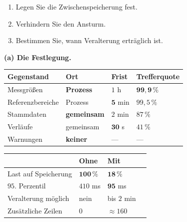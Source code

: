 \begin{aufgabe}
\begin{enumerate}[label=(\alph*)]
\item Legen Sie die Zwischenspeicherung fest.
\item Verhindern Sie den Ansturm.
\item Bestimmen Sie, wann Veralterung erträglich ist.
\end{enumerate}

\loesung
\textbf{(a) Die Festlegung.}

\begin{center}
{\small
\renewcommand{\arraystretch}{1.45}
\begin{tabular}{@{}P{2.6cm}P{2.0cm}P{2.0cm}P{2.2cm}@{}}
\toprule
\textbf{Gegenstand} & \textbf{Ort} & \textbf{Frist} & \textbf{Trefferquote}\\
\midrule
Messgrößen & \textbf{Prozess} & $1$ h & $\mathbf{99{,}9\,\%}$\\
Referenzbereiche & Prozess & $\mathbf{5}$ min & $99{,}5\,\%$\\
Stammdaten & \textbf{gemeinsam} & $2$ min & $87\,\%$\\
Verläufe & gemeinsam & $\mathbf{30}$ s & $41\,\%$\\
Warnungen & \textcolor{akzent}{\textbf{keiner}} & --- & --- \\
\bottomrule
\end{tabular}}
\end{center}

\begin{center}
\begin{minipage}{0.88\textwidth}
\end{minipage}
\end{center}

\begin{center}
\renewcommand{\arraystretch}{1.45}
\begin{tabular}{@{}P{3.0cm}P{2.2cm}P{2.4cm}P{1.8cm}@{}}
\toprule
& \textbf{Ohne} & \textbf{Mit} & \\
\midrule
Last auf Speicherung & $\mathbf{100\,\%}$ & $\mathbf{18\,\%}$ & \\
$95.$ Perzentil & $410$ ms & $\mathbf{95}$ ms & \\
Veralterung möglich & \textcolor{gruen}{nein} & \textcolor{akzent}{bis $2$ min} & \\
Zusätzliche Zeilen & $0$ & $\approx160$ & \\
\bottomrule
\end{tabular}
\end{center}


\end{aufgabe}
